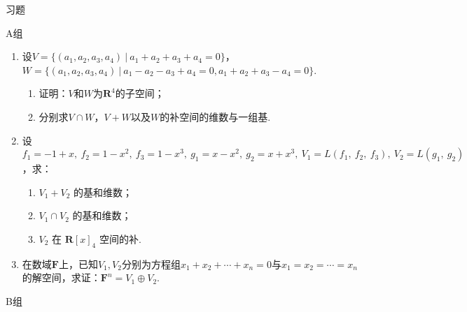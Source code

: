 \centerline{\heiti \Large 习题}
\vspace{2ex}
{\kaishu }
\begin{flushright}
    \kaishu

\end{flushright}
\centerline{\heiti A组}
\begin{enumerate}
    \item 设$V=\{(a_1,a_2,a_3,a_4)\ |\ a_1+a_2+a_3+a_4=0\}$，$W=\{(a_1,a_2,a_3,a_4)\ |\ a_1-a_2-a_3+a_4=0,a_1+a_2+a_3-a_4=0\}$.
	\begin{enumerate}[label=(\arabic*)]
        \item 证明：$V$和$W$为$\mathbf{R}^4$的子空间；
        \item 分别求$V \cap W$，$V+W$以及$W$的补空间的维数与一组基.
    \end{enumerate}
	\item 设 $f_1=-1+x,\ f_2=1-x^2,\ f_3=1-x^3,\ g_1=x-x^2,\ g_2=x+x^3,\ V_1=L\left(f_1,\ f_2,\ f_3\right),\ V_2=L\left(g_1,\ g_2\right)$，求：
    \begin{enumerate}[label=(\arabic*)]
        \item $V_1+V_2$ 的基和维数；
        \item $V_1 \cap V_2$ 的基和维数；
        \item $V_2$ 在 $\mathbf{R}[x]_4$ 空间的补.
    \end{enumerate}
	\item 在数域$\mathbf{F}$上，已知$V_1,V_2$分别为方程组$x_1+x_2+\cdots+x_n=0$与$x_1=x_2=\cdots=x_n$
	的解空间，求证：$\mathbf{F}^n=V_1\oplus V_2$.
\end{enumerate}
\centerline{\heiti B组}
